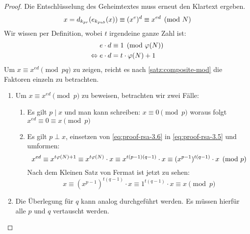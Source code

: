 \begin{proof}
  Die Entschlüsselung des Geheimtextes muss erneut den Klartext ergeben.
  \begin{equation}
    \label{eq:proof-rsa-3.5}
    x = d_{k_{pr}}(e_{k_{pub}}(x)) \equiv (x^e)^d \equiv x^{ed} \pmod{N}
  \end{equation}
  Wir wissen per Definition, wobei $t$ irgendeine ganze Zahl ist:
  \begin{align}
    e \cdot d                 & \equiv 1 \pmod{\varphi(N)} \notag \\
    \label{eq:proof-rsa-3.6}
    \Leftrightarrow e \cdot d & = t \cdot \varphi(N) + 1
  \end{align}
  Um $x \equiv x^{ed} \pmod{pq}$ zu zeigen, reicht es nach \autoref{satz:composite-mod}
  die Faktoren einzeln zu betrachten.
  \begin{enumerate}
    \item Um $x \equiv x^{ed} \pmod{p}$ zu beweisen, betrachten wir zwei Fälle:
          \begin{enumerate}[topsep=0pt]
            \item Es gilt $p \mid x$ und man kann schreiben:
                  $x \equiv 0 \pmod{p}$ woraus folgt $x^{ed} \equiv 0 \equiv x \pmod{p}$
            \item Es gilt $p \perp x$, einsetzen von \eqref{eq:proof-rsa-3.6} in
                  \eqref{eq:proof-rsa-3.5}
                  und umformen:
                  \begin{equation*}
                    x^{ed} \equiv x^{t\varphi(N) + 1} \equiv
                    x^{t\varphi(N)} \cdot x \equiv
                    x^{t(p - 1)(q - 1)} \cdot x \equiv
                    (x^{p - 1})^{t(q - 1)} \cdot x \pmod{p}
                  \end{equation*}
                  Nach dem Kleinen Satz von Fermat ist jetzt zu sehen:
                  \begin{equation*}
                    x \equiv (x^{p - 1})^{t(q - 1)} \cdot x \equiv
                    1^{t(q - 1)} \cdot x \equiv x \pmod{p}
                  \end{equation*}
          \end{enumerate}
    \item Die Überlegung für $q$ kann analog durchgeführt werden. Es müssen hierfür
          alle $p$ und $q$ vertauscht werden.
  \end{enumerate}
\end{proof}

